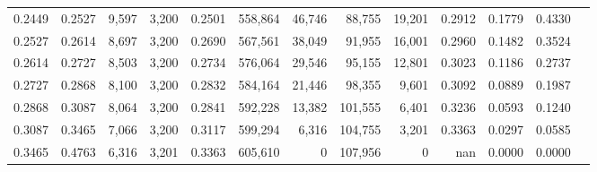 \begin{tabular}{rrrrrrrrrrrrr}
0.2449 & 0.2527 &  9,597 & 3,200 &                                     0.2501 & 558,864 &  46,746 &  88,755 &  19,201 & 0.2912 & 0.1779 & 0.4330 \\
0.2527 & 0.2614 &  8,697 & 3,200 &                                     0.2690 & 567,561 &  38,049 &  91,955 &  16,001 & 0.2960 & 0.1482 & 0.3524 \\
0.2614 & 0.2727 &  8,503 & 3,200 &                                     0.2734 & 576,064 &  29,546 &  95,155 &  12,801 & 0.3023 & 0.1186 & 0.2737 \\
0.2727 & 0.2868 &  8,100 & 3,200 &                                     0.2832 & 584,164 &  21,446 &  98,355 &   9,601 & 0.3092 & 0.0889 & 0.1987 \\
0.2868 & 0.3087 &  8,064 & 3,200 &                                     0.2841 & 592,228 &  13,382 & 101,555 &   6,401 & 0.3236 & 0.0593 & 0.1240 \\
0.3087 & 0.3465 &  7,066 & 3,200 &                                     0.3117 & 599,294 &   6,316 & 104,755 &   3,201 & 0.3363 & 0.0297 & 0.0585 \\
0.3465 & 0.4763 &  6,316 & 3,201 &                                     0.3363 & 605,610 &       0 & 107,956 &       0 &    nan & 0.0000 & 0.0000 \\
\bottomrule
\end{tabular}
